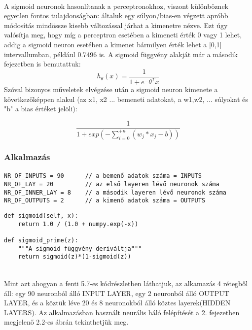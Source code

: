 \paragraph{}
A sigmoid neuronok hasonlítanak a perceptronokhoz, viszont különböznek egyetlen fontos tulajdonságban: általuk egy súlyon/bias-en végzett apróbb módosítás mindössze kisebb változással járhat a kimenetre nézve. Ezt úgy valósítja meg, hogy míg a perceptron esetében a kimeneti érték 0 vagy 1 lehet, addig a sigmoid neuron esetében a kimenet bármilyen érték lehet a [0,1] intervallumban, például 0.7496 is. A sigmoid függvény alakját már a második fejezetben is bemutattuk:
$$h_ \theta (x) =  \frac{\mathrm{1} }{\mathrm{1} + e^- \theta^Tx }  $$ 
Szóval bizonyos műveletek elvégzése után a sigmoid neuron kimenete  a következőképpen alakul (az x1, x2 ... bemeneti adatokat, a w1,w2, ... súlyokat és "b" a bias értéket jelöli):

$$\frac{\mathrm{1} }{\mathrm{1} + exp(-\sum_{i=0}^{+n} (w_j * x_j - b)) }  $$ 

\subsubsection{Alkalmazás}
\paragraph{}


\begin{lstlisting}[caption=A neurális háló felépítése]
NR_OF_INPUTS = 90      // a bemenő adatok száma = INPUTS
NR_OF_LAY = 20         // az első layeren lévő neuronok száma
NR_OF_INNER_LAY = 8    // a második layeren lévő neuronok száma
NR_OF_OUTPUTS = 2      // a kimenő adatok száma = OUTPUTS
\end{lstlisting}

\begin{lstlisting}[caption=A szigmoid függvény Pythonban]
def sigmoid(self, x):
    return 1.0 / (1.0 + numpy.exp(-x))
    
def sigmoid_prime(z):
    """A sigmoid függvény deriváltja"""
    return sigmoid(z)*(1-sigmoid(z))
    
\end{lstlisting}

\paragraph{}
Mint azt ahogyan a fenti 5.7-es kódrészletben láthatjuk, az alkamazás 4 rétegből áll:  egy 90 neuronból álló INPUT LAYER, egy 2 neuronból álló OUTPUT LAYER, és a köztük léve 20 és 8 neuronokból álló köztes layerek(HIDDEN LAYERS). Az alkalmazásban használt neurális háló felépítését a 2. fejezetben megjelenő 2.2-es ábrán tekinthetjük meg.

